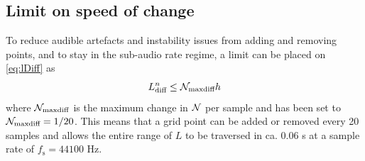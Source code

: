 \subsection{Limit on speed of change}\label{sec:limit}
To reduce audible artefacts and instability issues from adding and removing points, and to stay in the sub-audio rate regime, a limit can be placed on \eqref{eq:lDiff} as
\begin{equation}\label{eq:Nmaxdiff} 
    L_\text{diff}^n \leq \mathcal{N}_\text{maxdiff} h
\end{equation}
where $\mathcal{N}_\text{maxdiff}$ is the maximum change in $\mathcal{N}$ per sample and has been set to $\mathcal{N}_\text{maxdiff} = 1/20$. This means that a grid point can be added or removed every 20 samples and allows the entire range of $L$ to be traversed in ca. 0.06 s at a sample rate of $f_\text{s} = 44100$ Hz. 

